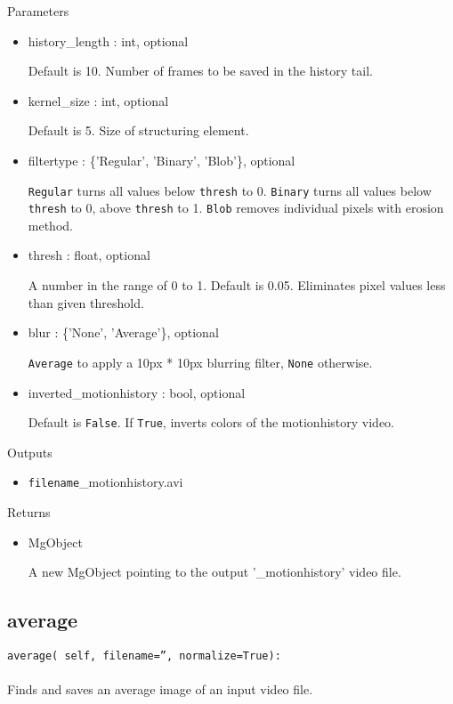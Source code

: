 \documentclass[9pt]{extarticle}
\def\code#1{\texttt{#1}}
\begin{document}
\noindent Parameters
\begin{itemize}
\item history\_length : int, optional

Default is 10. Number of frames to be saved in the history tail.

\item kernel\_size : int, optional

Default is 5. Size of structuring element.

\item filtertype : \{'Regular', 'Binary', 'Blob'\}, optional

\code{Regular} turns all values below \code{thresh} to 0.
\code{Binary} turns all values below \code{thresh} to 0, 
above \code{thresh} to 1. \code{Blob} removes individual pixels 
with erosion method.

\item thresh : float, optional

A number in the range of 0 to 1. Default is 0.05.
Eliminates pixel values less than given threshold.

\item blur : \{'None', 'Average'\}, optional

\code{Average} to apply a 10px * 10px blurring filter, 
\code{None} otherwise.

\item inverted\_motionhistory : bool, optional

Default is \code{False}. If \code{True}, inverts colors 
of the motionhistory video.
\end{itemize}

\noindent Outputs
\begin{itemize}
\item \code{filename}\_motionhistory.avi
\end{itemize}

\noindent Returns
\begin{itemize}
\item MgObject

A new MgObject pointing to the output '\_motionhistory' video file.
\end{itemize}


\subsection{average}

\code{average(
    self, 
    filename='', 
    normalize=True):}
\\\\
Finds and saves an average image of an input video file.
\\\\
\end{document}
